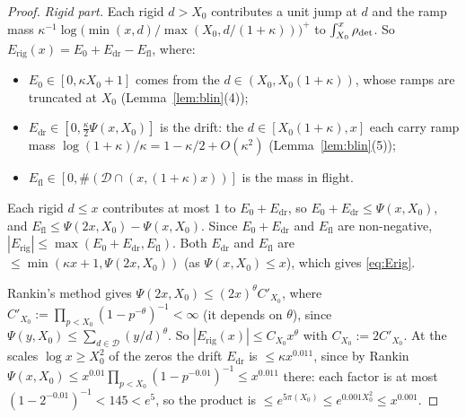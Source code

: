 \begin{proof}
\emph{Rigid part.} Each rigid $d>X_0$ contributes a unit jump at $d$ and the ramp mass
$\kappa^{-1}\log\bigl(\min(x,d)/\max(X_0,d/(1+\kappa))\bigr)^+$ to $\int_{X_0}^x\rho_{\mathrm{det}}$. So $E_{\mathrm{rig}}(x)=E_0+E_{\mathrm{dr}}-E_{\mathrm{fl}}$, where:
\begin{itemize}
\item $E_0\in[0,\kappa X_0+1]$ comes from the $d\in(X_0,X_0(1+\kappa))$, whose ramps are truncated at $X_0$ (Lemma~\ref{lem:blin}(4));
\item $E_{\mathrm{dr}}\in[0,\tfrac\kappa2\Psi(x,X_0)]$ is the drift: the $d\in[X_0(1+\kappa),x]$ each carry ramp mass
$\log(1+\kappa)/\kappa=1-\kappa/2+O(\kappa^2)$ (Lemma~\ref{lem:blin}(5));
\item $E_{\mathrm{fl}}\in[0,\#(\mathcal D\cap(x,(1+\kappa)x))]$ is the mass in flight.
\end{itemize}
Each rigid $d\le x$ contributes at most $1$ to $E_0+E_{\mathrm{dr}}$, so $E_0+E_{\mathrm{dr}}\le\Psi(x,X_0)$, and
$E_{\mathrm{fl}}\le\Psi(2x,X_0)-\Psi(x,X_0)$. Since $E_0+E_{\mathrm{dr}}$ and $E_{\mathrm{fl}}$ are non-negative,
$|E_{\mathrm{rig}}|\le\max(E_0+E_{\mathrm{dr}},E_{\mathrm{fl}})$. Both $E_{\mathrm{dr}}$ and $E_{\mathrm{fl}}$ are
$\le\min(\kappa x+1,\Psi(2x,X_0))$ (as $\Psi(x,X_0)\le x$), which gives \eqref{eq:Erig}.

Rankin's method gives $\Psi(2x,X_0)\le(2x)^{\theta}C'_{X_0}$, where $C'_{X_0}:=\prod_{p<X_0}(1-p^{-\theta})^{-1}<\infty$ (it depends on $\theta$), since
$\Psi(y,X_0)\le\sum_{d\in\mathcal D}(y/d)^{\theta}$. So $|E_{\mathrm{rig}}(x)|\le C_{X_0}x^{\theta}$ with $C_{X_0}:=2C'_{X_0}$. At the
scales $\log x\ge X_0^2$ of the zeros the drift $E_{\mathrm{dr}}$ is $\le\kappa x^{0.011}$, since by Rankin
$\Psi(x,X_0)\le x^{0.01}\prod_{p<X_0}(1-p^{-0.01})^{-1}\le x^{0.011}$ there: each factor is at most $(1-2^{-0.01})^{-1}<145<e^5$, so the
product is $\le e^{5\pi(X_0)}\le e^{0.001X_0^2}\le x^{0.001}$.


\end{proof}
